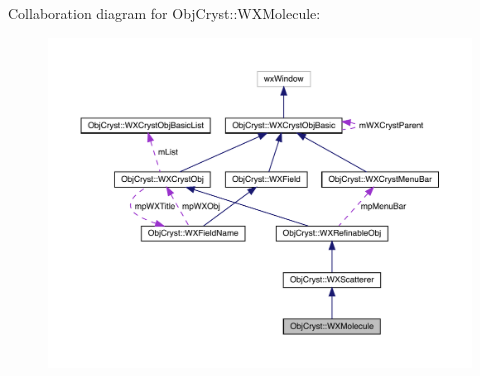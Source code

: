 Collaboration diagram for Obj\+Cryst\+::W\+X\+Molecule\+:
\nopagebreak
\begin{figure}[H]
\begin{center}
\leavevmode
\includegraphics[width=350pt]{class_obj_cryst_1_1_w_x_molecule__coll__graph}
\end{center}
\end{figure}

